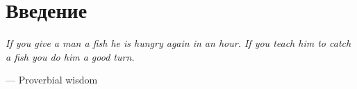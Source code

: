 \chapter*{Введение}

\epigraph{\itshape If you give a man a fish he is hungry again in an hour. 
If you teach him to catch a fish you do him a good turn.}
{--- Proverbial wisdom}


